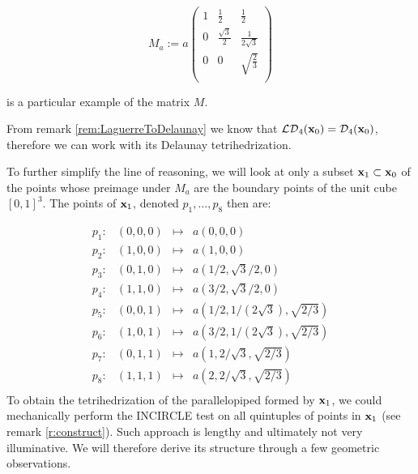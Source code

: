 $$
M_a := a \begin{pmatrix}
1 & \frac 12 & \frac 12 \\
0 & \frac {\sqrt{3}}2 & \frac 1{2\sqrt{3}}  \\
0 & 0 & \sqrt{\frac 23} \\
\end{pmatrix}
$$

is a particular example of the matrix $M$. \newline

\noindent From remark \ref{rem:LaguerreToDelaunay} we know that $\mathcal {LD}_4({\mathbf{x}}_0) = \mathcal D_4({\mathbf{x}}_0)$, therefore we can work with its Delaunay tetrihedrization.

To further simplify the line of reasoning, we will look at only a subset ${\mathbf{x}}_1\subset {\mathbf{x}}_0$ of the points whose preimage under $M_a$ are the boundary points of the unit cube $[0,1]^3$. The points of ${\mathbf{x}}_1$, denoted $p_1, \dots, p_8$ then are:


$$\begin{matrix}
	p_1: & (0,0,0) & \longmapsto & a(0,0,0) \\
	p_2: & (1,0,0) & \longmapsto & a(1,0,0)\\
	p_3: & (0,1,0) & \longmapsto & a(1/2,\sqrt{3}/2,0)\\
	p_4: & (1,1,0) & \longmapsto & a(3/2,\sqrt{3}/2,0)\\

	p_5: & (0,0,1) & \longmapsto & a(1/2,1/(2\sqrt{3}),\sqrt{2/3})\\
	p_6: & (1,0,1) & \longmapsto & a(3/2,1/(2\sqrt{3}),\sqrt{2/3})\\
	p_7: & (0,1,1) & \longmapsto & a(1,2/\sqrt3, \sqrt{2/3})\\
	p_8: & (1,1,1) & \longmapsto & a(2,2/\sqrt3, \sqrt{2/3})\\
\end{matrix}$$
To obtain the tetrihedrization of the parallelopiped formed by $\x_1$, we could mechanically perform the INCIRCLE test on all quintuples of points in $\x_1$ (see remark \ref{r:construct}). Such approach is lengthy and ultimately not very illuminative. We will therefore derive its structure through a few geometric observations.


